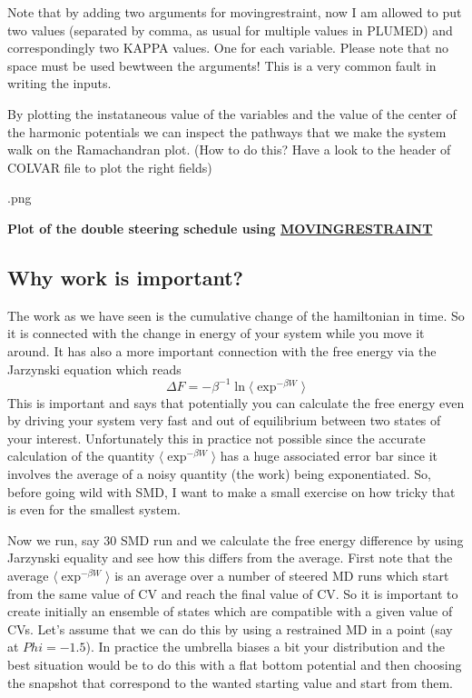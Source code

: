 Note that by adding two arguments for movingrestraint, now I am allowed to put two values (separated by comma, as usual for multiple values in P\+L\+U\+M\+E\+D) and correspondingly two K\+A\+P\+P\+A values. One for each variable. Please note that no space must be used bewtween the arguments! This is a very common fault in writing the inputs.

By plotting the instataneous value of the variables and the value of the center of the harmonic potentials we can inspect the pathways that we make the system walk on the Ramachandran plot. (How to do this? Have a look to the header of C\+O\+L\+V\+A\+R file to plot the right fields)

\label{belfast-5_belfast-5-doublesteer}%
\hypertarget{belfast-5_belfast-5-doublesteer}{}%
.png  \begin{center} {\bfseries  Plot of the double steering schedule using \hyperlink{MOVINGRESTRAINT}{M\+O\+V\+I\+N\+G\+R\+E\+S\+T\+R\+A\+I\+N\+T} } \end{center} \hypertarget{belfast-5_belfast-5-work}{}\subsection{Why work is important?}\label{belfast-5_belfast-5-work}
The work as we have seen is the cumulative change of the hamiltonian in time. So it is connected with the change in energy of your system while you move it around. It has also a more important connection with the free energy via the Jarzynski equation which reads \[ \Delta F=-\beta^{-1}\ln \langle \exp^{-\beta W} \rangle \] This is important and says that potentially you can calculate the free energy even by driving your system very fast and out of equilibrium between two states of your interest. Unfortunately this in practice not possible since the accurate calculation of the quantity $ \langle \exp^{-\beta W} \rangle $ has a huge associated error bar since it involves the average of a noisy quantity (the work) being exponentiated. So, before going wild with S\+M\+D, I want to make a small exercise on how tricky that is even for the smallest system.

Now we run, say 30 S\+M\+D run and we calculate the free energy difference by using Jarzynski equality and see how this differs from the average. First note that the average $ \langle \exp^{-\beta W} \rangle $ is an average over a number of steered M\+D runs which start from the same value of C\+V and reach the final value of C\+V. So it is important to create initially an ensemble of states which are compatible with a given value of C\+Vs. Let's assume that we can do this by using a restrained M\+D in a point (say at $ Phi=-1.5 $). In practice the umbrella biases a bit your distribution and the best situation would be to do this with a flat bottom potential and then choosing the snapshot that correspond to the wanted starting value and start from them.

